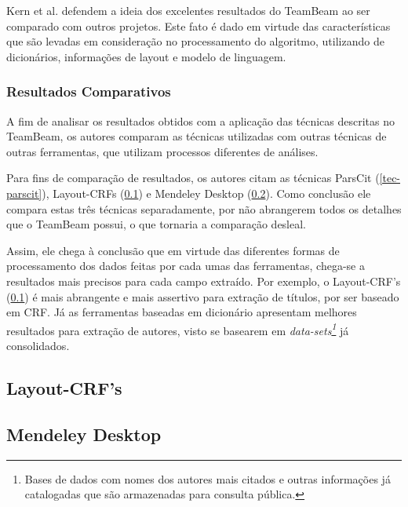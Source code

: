 Kern et al. defendem a ideia dos excelentes resultados do TeamBeam ao ser comparado com outros projetos. Este fato é dado em virtude das características que são levadas em consideração no processamento do algoritmo, utilizando de dicionários, informações de layout e modelo de linguagem.

\subsubsection{Resultados Comparativos}

A fim de analisar os resultados obtidos com a aplicação das técnicas descritas no TeamBeam, os autores comparam as técnicas utilizadas com outras técnicas de outras ferramentas, que utilizam processos diferentes de análises.

Para fins de comparação de resultados, os autores citam as técnicas ParsCit (\ref{tec-parscit}), Layout-CRFs (\ref{tec-layout-crfs}) e Mendeley Desktop (\ref{tec-mendeley}). Como conclusão ele compara estas três técnicas separadamente, por não abrangerem todos os detalhes que o TeamBeam possui, o que tornaria a comparação desleal.

Assim, ele chega à conclusão que em virtude das diferentes formas de processamento dos dados feitas por cada umas das ferramentas, chega-se a resultados mais precisos para cada campo extraído. Por exemplo, o Layout-CRF's (\ref{tec-layout-crfs}) é mais abrangente e mais assertivo para extração de títulos, por ser baseado em CRF. Já as ferramentas baseadas em dicionário apresentam melhores resultados para extração de autores, visto se basearem em \textit{data-sets\footnote{Bases de dados com nomes dos autores mais citados e outras informações já catalogadas que são armazenadas para consulta pública.}} já consolidados.


\subsection{Layout-CRF's}
\label{tec-layout-crfs}


\subsection{Mendeley Desktop}
\label{tec-mendeley}


